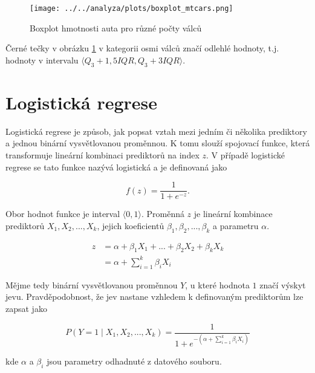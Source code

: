 \begin{figure}[H]
    \centering
    \texttt{[image: ../../analyza/plots/boxplot\_mtcars.png]}
    \caption{Boxplot hmotnosti auta pro různé počty válců} 
    \label{fig:boxplot_mtcars}
\end{figure}

Černé tečky v obrázku \ref{fig:boxplot_mtcars} v kategorii osmi válců značí odlehlé hodnoty, t.j. hodnoty
v intervalu $\langle Q_3 + 1,5IQR, Q_3 + 3IQR \rangle$.

\newpage
\section{Logistická regrese}
Logistická regrese je způsob, jak popsat vztah mezi jedním či několika prediktory a jednou binární vysvětlovanou 
proměnnou. K tomu slouží spojovací funkce, která transformuje lineární kombinaci prediktorů na index $z$. V případě
logistické regrese se tato funkce nazývá logistická a je definovaná jako

\begin{equation}
    \label{eq:logisticka_funkce}
    f(z) = \frac{1}{1 + e^{-z}}.
\end{equation}

Obor hodnot funkce je interval $\langle 0, 1 \rangle$. Proměnná $z$ je lineární kombinace prediktorů  $X_1, X_2, ..., X_k$, 
jejich koeficientů $\beta_1, \beta_2, ..., \beta_k$ a parametru $\alpha$.

\begin{equation}
    \label{eq:linearni_kombinace_z}
    \begin{split}
        z &= \alpha + \beta_1 X_1 + ... + \beta_2 X_2 +\beta_k X_k \\
          &= \alpha + \sum_{i=1}^k \beta_i X_i
    \end{split}
\end{equation}

Mějme tedy binární vysvětlovanou proměnnou $Y$, u které hodnota $1$ značí výskyt jevu. Pravděpodobnost, že jev nastane
vzhledem k definovaným prediktorům lze zapsat jako

\begin{equation}
    \label{eq:pravdepodobnost_y}
    P(Y = 1 \mid X_1, X_2, ..., X_k) = \frac{1}{1 + e^{- \left( \alpha + \sum_{i=1}^k \beta_i X_i \right) }}
\end{equation}

kde $\alpha$ a $\beta_i$ jsou parametry odhadnuté z datového souboru. 

